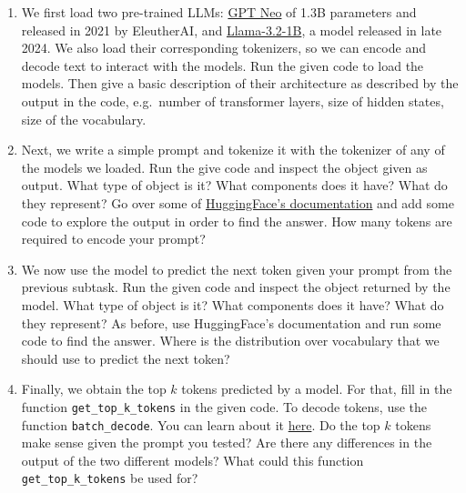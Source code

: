 \documentclass[11pt,a4paper]{article}
\begin{document}
\begin{enumerate}[label=(\alph*)]
    \item We first load two pre-trained LLMs:
          \href{https://github.com/EleutherAI/gpt-neo}{GPT Neo} of 1.3B
          parameters and released in 2021 by EleutherAI, and
          \href{https://huggingface.co/meta-llama/Llama-3.2-1B}{Llama-3.2-1B},
          a model released in late 2024.
          We also load their corresponding tokenizers, so we can encode and
          decode text to interact with the models.
          Run the given code to load the models.
          Then give a basic description of their architecture as described by
          the output in the code, e.g.\ number of transformer layers, size of
          hidden states, size of the vocabulary.
    \item Next, we write a simple prompt and tokenize it with the
          tokenizer of any of the models we loaded. Run the give code and
          inspect the object given as output. What type of object is it? What
          components does it have? What do they represent? Go over some of
          \href{https://huggingface.co/docs/transformers/index}{HuggingFace's documentation}
          and add some code to explore the output in order to find the answer.
          How many tokens are required to encode your prompt?
    \item We now use the model to predict the next token given your prompt
          from the previous subtask. Run the given code and inspect the object
          returned by the model. What type of object is it? What components does
          it have? What do they represent?
          As before, use HuggingFace's documentation and run some code to find
          the answer.
          Where is the distribution over vocabulary that we should use to
          predict the next token?
    \item Finally, we obtain the top $k$ tokens predicted by a model. For that,
          fill in the function \texttt{get\_top\_k\_tokens} in the given code.
          To decode tokens, use the function \texttt{batch\_decode}. You can
          learn about it
          \href{https://huggingface.co/docs/transformers/en/main_classes/tokenizer#transformers.PreTrainedTokenizerFast.batch_decode}{here}.
          Do the top $k$ tokens make sense given the prompt you tested? Are
          there any differences in the output of the two different models?
          What could this function \texttt{get\_top\_k\_tokens} be used for?
\end{enumerate}
\end{document}
